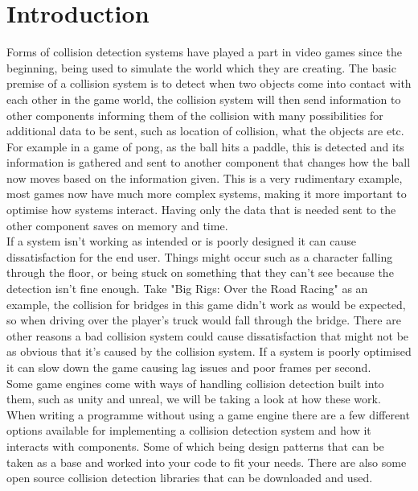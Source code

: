 \documentclass{scrartcl}
\begin{document}
	\section{Introduction}
	Forms of collision detection systems have played a part in video games since the beginning, being used to simulate the world which they are creating. The basic premise of a collision system is to detect when two objects come into contact with each other in the game world, the collision system will then send information to other components informing them of the collision with many possibilities for additional data to be sent, such as location of collision, what the objects are etc. For example in a game of pong, as the ball hits a paddle, this is detected and its information is gathered and sent to another component that changes how the ball now moves based on the information given. This is a very rudimentary example, most games now have much more complex systems, making it more important to optimise how systems interact. Having only the data that is needed sent to the other component saves on memory and time.\\
	If a system isn't working as intended or is poorly designed it can cause dissatisfaction for the end user. Things might occur such as a character falling through the floor, or being stuck on something that they can't see because the detection isn't fine enough. Take "Big Rigs: Over the Road Racing"\cite{bigrigs} as an example, the collision for bridges in this game didn't work as would be expected, so when driving over the player's truck would fall through the bridge. There are other reasons a bad collision system could cause dissatisfaction that might not be as obvious that it's caused by the collision system. If a system is poorly optimised it can slow down the game causing lag issues and poor frames per second.\\
	Some game engines come with ways of handling collision detection built into them, such as unity and unreal\cite{dickson2017experience}, we will be taking a look at how these work. When writing a programme without using a game engine there are a few different options available for implementing a collision detection system and how it interacts with components. Some of which being design patterns that can be taken as a base and worked into your code to fit your needs\cite{designpatternsandrefactoring_2018}. There are also some open source collision detection libraries that can be downloaded and used\cite{jslee02/awesome-collision-detection_2018}. 
	
\end{document}

